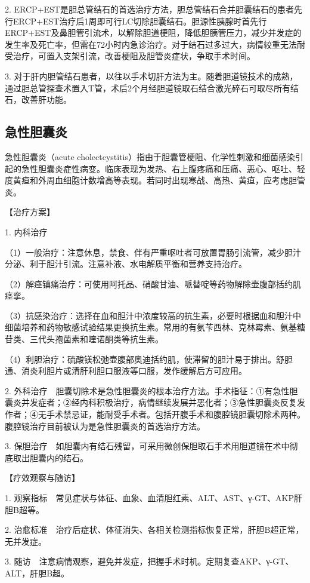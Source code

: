 2.
ERCP+EST是胆总管结石的首选治疗方法，胆总管结石合并胆囊结石的患者先行ERCP+EST治疗后1周即可行LC切除胆囊结石。胆源性胰腺时首先行ERCP+EST及鼻胆管引流术，以解除胆道梗阻，降低胆胰管压力，减少并发症的发生率及死亡率，但需在72小时内急诊治疗。对于结石过多过大，病情较重无法耐受治疗，可置入支架引流，改善梗阻及胆管炎症状，争取手术时间。

3.
对于肝内胆管结石患者，以往以手术切肝方法为主。随着胆道镜技术的成熟，通过胆总管探查术置入T管，术后2个月经胆道镜取石结合激光碎石可取尽所有结石，改善肝功能。

\subsection{急性胆囊炎}

急性胆囊炎（acute
cholectcystitis）指由于胆囊管梗阻、化学性刺激和细菌感染引起的急性胆囊炎症性病变。临床表现为发热、右上腹疼痛和压痛、恶心、呕吐、轻度黄疸和外周血细胞计数增高等表现。若同时出现寒战、高热、黄疸，应考虑胆管炎。

【治疗方案】

1. 内科治疗

（1）一般治疗：注意休息，禁食、伴有严重呕吐者可放置胃肠引流管，减少胆汁分泌、利于胆汁引流。注意补液、水电解质平衡和营养支持治疗。

（2）解痉镇痛治疗：可使用阿托品、硝酸甘油、哌替啶等药物解除壶腹部括约肌痉挛。

（3）抗感染治疗：选择在血和胆汁中浓度较高的抗生素，必要时根据血和胆汁中细菌培养和药物敏感试验结果更换抗生素。常用的有氨苄西林、克林霉素、氨基糖苷类、三代头孢菌素和喹诺酮类等抗生素。

（4）利胆治疗：硫酸镁松弛壶腹部奥迪括约肌，使滞留的胆汁易于排出。舒胆通、消炎利胆片或清肝利胆口服液等口服，发作缓解后方可应用。

2.
外科治疗　胆囊切除术是急性胆囊炎的根本治疗方法。手术指征：①有急性胆囊炎并发症者；②经内科积极治疗，病情继续发展并恶化者；③急性胆囊炎反复发作者；④无手术禁忌证，能耐受手术者。包括开腹手术和腹腔镜胆囊切除术两种。腹腔镜治疗目前被认为是急性胆囊炎的首选治疗方法。

3.
保胆治疗　如胆囊内有结石残留，可采用微创保胆取石手术用胆道镜在术中彻底取出胆囊内的结石。

【疗效观察与随访】

1.
观察指标　常见症状与体征、血象、血清胆红素、ALT、AST、γ-GT、AKP肝胆B超等。

2.
治愈标准　治疗后症状、体征消失、各相关检测指标恢复正常，肝胆B超正常，无并发症。

3.
随访　注意病情观察，避免并发症，把握手术时机。定期复查AKP、γ-GT、ALT，肝胆B超。


